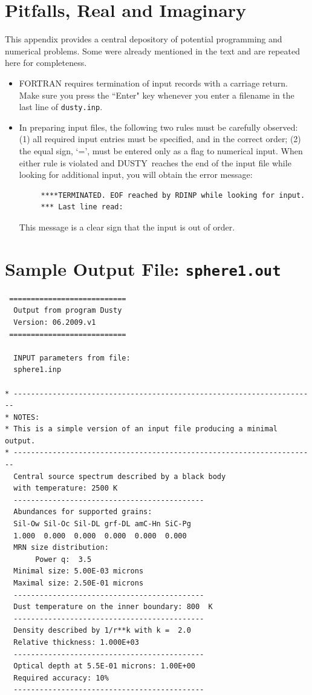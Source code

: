 \documentclass[11pt]{article}
\def\D  {{\sf DUSTY}}
\begin{document}
\begin{appendix}
\section{Pitfalls, Real and Imaginary} \label{pitfalls}

This appendix provides a central depository of potential programming and
numerical problems. Some were already mentioned in the text and are repeated
here for completeness.

\begin{itemize}
\item FORTRAN requires termination of input records with a carriage return.
    Make sure you press the ``Enter" key whenever you enter a filename in
    the last line of {\tt dusty.inp}.

\item In preparing input files, the following two rules must be carefully
    observed: (1) all required input entries must be specified, and in the
    correct order; (2) the equal sign, `=', must be entered only as a flag
    to numerical input. When either rule is violated and \D\ reaches the
    end of the input file while looking for additional input, you will
    obtain the error message:
\begin{verbatim}
     ****TERMINATED. EOF reached by RDINP while looking for input.
     *** Last line read:
\end{verbatim}
This message is a clear sign that the input is out of order.

\end{itemize}

\vspace {1cm}

\section{Sample Output File: {\tt sphere1.out}}
\label{sphere1}

\begin{verbatim}
 ===========================
  Output from program Dusty
  Version: 06.2009.v1
 ===========================

  INPUT parameters from file:
  sphere1.inp

* ----------------------------------------------------------------------
* NOTES:
* This is a simple version of an input file producing a minimal output.
* ----------------------------------------------------------------------
  Central source spectrum described by a black body
  with temperature: 2500 K
  --------------------------------------------
  Abundances for supported grains:
  Sil-Ow Sil-Oc Sil-DL grf-DL amC-Hn SiC-Pg
  1.000  0.000  0.000  0.000  0.000  0.000
  MRN size distribution:
       Power q:  3.5
  Minimal size: 5.00E-03 microns
  Maximal size: 2.50E-01 microns
  --------------------------------------------
  Dust temperature on the inner boundary: 800  K
  --------------------------------------------
  Density described by 1/r**k with k =  2.0
  Relative thickness: 1.000E+03
  --------------------------------------------
  Optical depth at 5.5E-01 microns: 1.00E+00
  Required accuracy: 10%
  --------------------------------------------


\end{verbatim}
\end{appendix}
\end{document}
